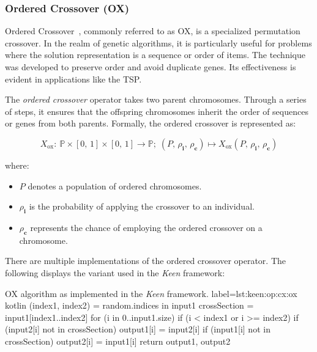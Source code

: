 \subsubsection{Ordered Crossover (OX)}
\label{sec:keen:op:cx:ox}

  Ordered Crossover~\autocite{bergelAgileArtificialIntelligence2020}, commonly 
  referred to as OX, is a specialized permutation crossover. In the realm of 
  genetic algorithms, it is particularly useful for problems where the solution 
  representation is a sequence or order of items. The technique was developed 
  to preserve order and avoid duplicate genes. Its effectiveness is evident in 
  applications like the TSP.

  \begin{definition}
    The \textit{ordered crossover} operator takes two parent chromosomes. 
    Through a series of steps, it ensures that the offspring chromosomes 
    inherit the order of sequences or genes from both parents. Formally, the 
    ordered crossover is represented as:

    \begin{equation}
      X_\mathrm{ox} :\: 
        \mathbb{P} \times [0,\, 1] \times [0,\, 1] \rightarrow \mathbb{P};\;
        (P,\, \rho_\textbf{i},\, \rho_\mathbf{c})
          \mapsto X_\mathrm{ox}(P,\, \rho_\textbf{i},\, \rho_\mathbf{c})
    \end{equation}

    where:

    \begin{itemize}
      \item \(P\) denotes a population of ordered chromosomes.
      \item \(\rho_\textbf{i}\) is the probability of applying the crossover to an 
        individual.
      \item \(\rho_\mathbf{c}\) represents the chance of employing the 
        ordered crossover on a chromosome.
    \end{itemize}
  \end{definition}

  There are multiple implementations of the ordered crossover operator. The 
  following displays the variant used in the \textit{Keen} framework:

  \begin{code}{
      OX algorithm as implemented in the \textit{Keen} framework.
  }{
      label={lst:keen:op:cx:ox}
  }{kotlin}
      (index1, index2) = random.indices in input1
      crossSection = input1[index1..index2]
      for (i in 0..input1.size) {
          if (i < index1 or i >= index2) {
              if (input2[i] not in crossSection) {
                  output1[i] = input2[i]
              }
              if (input1[i] not in crossSection) {
                  output2[i] = input1[i]
              }
          }
      }
      return output1, output2
  \end{code}

